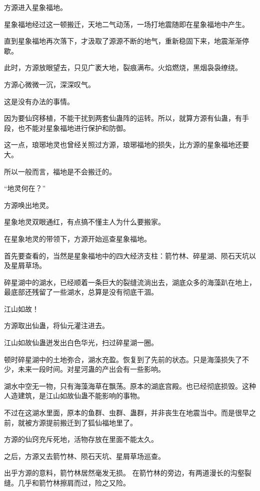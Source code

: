 
\begin{this_body}

方源进入星象福地。

星象福地经过这一顿搬迁，天地二气动荡，一场打地震随即在星象福地中产生。

直到星象福地再次落下，才汲取了源源不断的地气，重新稳固下来，地震渐渐停歇。

此时，方源放眼望去，只见广袤大地，裂痕满布。火焰燃烧，黑烟袅袅缭绕。

方源心微微一沉，深深叹气。

这是没有办法的事情。

因为要仙窍移植，不能干扰到两套仙蛊阵的运转。所以，就算方源有仙蛊，有手段，也不能对星象福地进行保护和防御。

这一点，琅琊地灵也曾经关照过方源，琅琊福地的损失，比方源的星象福地还要大。

所以一般而言，福地是不会搬迁的。

“地灵何在？”

方源唤出地灵。

星象地灵双眼通红，有点搞不懂主人为什么要搬家。

在星象地灵的带领下，方源开始巡查星象福地。

首先要查看的，当然是星象福地中的四大经济支柱：箭竹林、碎星湖、陨石天坑以及星屑草场。

碎星湖中的湖水，已经顺着一条巨大的裂缝流淌出去，湖底众多的海藻趴在地上，最底部还残留了一些湖水，总算是没有彻底干涸。

江山如故！

方源取出仙蛊，将仙元灌注进去。

江山如故仙蛊迸发出白色华光，扫过碎星湖一圈。

顿时碎星湖中的土地弥合，湖水充盈。恢复到了先前的状态。只是海藻损失了不少，未来一段时间。对星河蛊的产出会有一些影响。

湖水中空无一物，只有海藻海草在飘荡。原本的湖底宫殿。也已经彻底损毁。这种人造建筑，是江山如故仙蛊不能影响的事物。

不过在这湖水里面，原本的鱼群、虫群、蛊群，并非丧生在地震当中。而是很早之前，就被方源提前搬迁到了狐仙福地里了。

方源的仙窍充斥死地，活物存放在里面不能太久。

之后，方源又去箭竹林、陨石天坑、星屑草场巡查。

出乎方源的意料，箭竹林居然毫发无损。  在箭竹林的旁边，有两道漫长的沟壑裂缝。几乎和箭竹林擦肩而过，险之又险。


\end{this_body}

